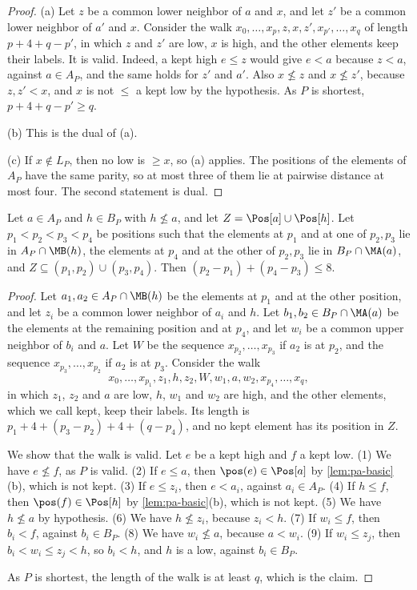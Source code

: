 \begin{proof}
(a) Let $z$ be a common lower neighbor of $a$ and $x$, and let $z'$ be a common lower neighbor of $a'$ and $x$.
Consider the walk $x_0, \dots, x_p, z, x, z', x_{p'}, \dots, x_q$ of length $p + 4 + q - p'$, in which $z$ and $z'$ are low, $x$ is high, and the other elements keep their labels.
It is valid.
Indeed, a kept high $e \leq z$ would give $e < a$ because $z < a$, against $a \in A_P$, and the same holds for $z'$ and $a'$.
Also $x \not\leq z$ and $x \not\leq z'$, because $z, z' < x$, and $x$ is not $\leq$ a kept low by the hypothesis.
As $P$ is shortest, $p + 4 + q - p' \geq q$.

(b) This is the dual of (a).

(c) If $x \notin L_P$, then no low is $\geq x$, so (a) applies.
The positions of the elements of $A_P$ have the same parity, so at most three of them lie at pairwise distance at most four.
The second statement is dual.
\end{proof}

\begin{lemma}
\label{lem:pa-two}
Let $a \in A_P$ and $h \in B_P$ with $h \not\leq a$, and let $Z = \Pos[a] \cup \Pos[h]$.
Let $p_1 < p_2 < p_3 < p_4$ be positions such that the elements at $p_1$ and at one of $p_2, p_3$ lie in $A_P \cap \MB(h)$, the elements at $p_4$ and at the other of $p_2, p_3$ lie in $B_P \cap \MA(a)$, and $Z \subseteq (p_1, p_2) \cup (p_3, p_4)$.
Then $(p_2 - p_1) + (p_4 - p_3) \leq 8$.
\end{lemma}

\begin{proof}
Let $a_1, a_2 \in A_P \cap \MB(h)$ be the elements at $p_1$ and at the other position, and let $z_i$ be a common lower neighbor of $a_i$ and $h$.
Let $b_1, b_2 \in B_P \cap \MA(a)$ be the elements at the remaining position and at $p_4$, and let $w_i$ be a common upper neighbor of $b_i$ and $a$.
Let $W$ be the sequence $x_{p_2}, \dots, x_{p_3}$ if $a_2$ is at $p_2$, and the sequence $x_{p_3}, \dots, x_{p_2}$ if $a_2$ is at $p_3$.
Consider the walk
\[
x_0, \dots, x_{p_1}, z_1, h, z_2, W, w_1, a, w_2, x_{p_4}, \dots, x_q,
\]
in which $z_1$, $z_2$ and $a$ are low, $h$, $w_1$ and $w_2$ are high, and the other elements, which we call kept, keep their labels.
Its length is $p_1 + 4 + (p_3 - p_2) + 4 + (q - p_4)$, and no kept element has its position in $Z$.

We show that the walk is valid.
Let $e$ be a kept high and $f$ a kept low.
(1) We have $e \not\leq f$, as $P$ is valid.
(2) If $e \leq a$, then $\pos(e) \in \Pos[a]$ by \cref{lem:pa-basic}(b), which is not kept.
(3) If $e \leq z_i$, then $e < a_i$, against $a_i \in A_P$.
(4) If $h \leq f$, then $\pos(f) \in \Pos[h]$ by \cref{lem:pa-basic}(b), which is not kept.
(5) We have $h \not\leq a$ by hypothesis.
(6) We have $h \not\leq z_i$, because $z_i < h$.
(7) If $w_i \leq f$, then $b_i < f$, against $b_i \in B_P$.
(8) We have $w_i \not\leq a$, because $a < w_i$.
(9) If $w_i \leq z_j$, then $b_i < w_i \leq z_j < h$, so $b_i < h$, and $h$ is a low, against $b_i \in B_P$.

As $P$ is shortest, the length of the walk is at least $q$, which is the claim.
\end{proof}

